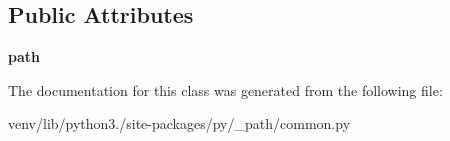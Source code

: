 \subsection*{Public Attributes}
\begin{DoxyCompactItemize}
\item 
\mbox{\label{classpy_1_1__path_1_1common_1_1_checkers_a55c724793fffcd4e3245979eb646508d}} 
{\bfseries path}
\end{DoxyCompactItemize}


The documentation for this class was generated from the following file\+:\begin{DoxyCompactItemize}
\item 
venv/lib/python3./site-\/packages/py/\+\_\+path/common.\+py\end{DoxyCompactItemize}
